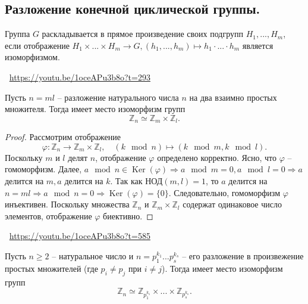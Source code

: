 \subsection{Разложение конечной циклической группы.}
\begin{definition}
    Группа $G$ раскладывается в прямое произведение своих подгрупп $H_1, ..., H_m$, если отображение $H_1 \times ... \times H_m \to G, (h_1, ..., h_m) \mapsto h_1 \cdot ... \cdot h_m$ является изоморфизмом.
\end{definition}
\large \faYoutube \normalsize $\>$ \url{https://youtu.be/1oceAPu3b8o?t=293}
\begin{theorem}
    Пусть $n = ml$ -- разложение натурального числа $n$ на два взаимно простых множителя. Тогда имеет место изоморфизм групп
    \[
        \mathbb{Z}_n \simeq \mathbb{Z}_m \times \mathbb{Z}_l.
    \]
    \begin{proof}
        Рассмотрим отображение
        \[
            \varphi : \mathbb{Z}_n \to \mathbb{Z}_m \times \mathbb{Z}_l,
            \quad
            (k \mod n) \mapsto (k \mod m, k \mod l).
        \]
        Поскольку $m$ и $l$ делят $n$, отображение $\varphi$ определено корректно. Ясно, что $\varphi$ -- гомоморфизм.
        \newline
        Далее, $a \mod n \in \operatorname{Ker}(\varphi) \Rightarrow a \mod m = 0, a \mod l = 0 \Rightarrow a $ делится на $ m, a $ делится на $ k$.
        Так как НОД$(m, l) = 1$, то $a$ делится на $n = ml \Rightarrow a \mod n = 0 \Rightarrow \operatorname{Ker}(\varphi) = \{0\}$. Следовательно, гомоморфизм $\varphi$ инъективен. Поскольку множества $\mathbb{Z}_n$ и $\mathbb{Z}_m \times \mathbb{Z}_l$ содержат одинаковое число элементов, отображение $\varphi$ биективно.
    \end{proof}
\end{theorem}
\large \faYoutube \normalsize $\>$ \url{https://youtu.be/1oceAPu3b8o?t=585}
\begin{consequence}
    Пусть $n \geqslant 2$ -- натуральное число и $n = p_1^{k_1} ... p_s^{k_s}$ -- его разложение в произвежение простых множителей (где $p_i \neq p_j$ при $i \neq j$). Тогда имеет место изоморфизм групп
    \[
        \mathbb{Z}_n \simeq \mathbb{Z}_{p_1^{k_1}} \times ... \times \mathbb{Z}_{p_s^{k_s}}.
    \]
\end{consequence}